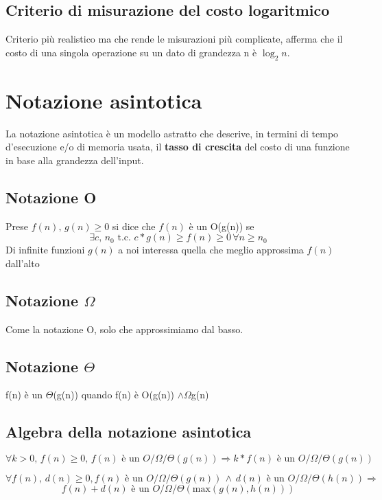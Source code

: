 \documentclass{report}
\newcommand{\T}[1]{$\Theta$(#1)}
\begin{document}
    \subsection{Criterio di misurazione del costo logaritmico}
        Criterio più realistico ma che rende le misurazioni più complicate, afferma 
        che il costo di una singola operazione su un dato di grandezza n è $\log_{2}n$. 
\section{Notazione asintotica}
    La notazione asintotica è un modello astratto che descrive, in termini di 
    tempo d'esecuzione e/o di memoria usata, il \textbf{tasso di crescita} del
    costo di una funzione in base alla grandezza dell'input.
    \subsection{Notazione O}
        Prese $f\left(n\right), \, g\left(n\right) \geq 0$ si dice che $f(n)$ è un O(g(n)) se 
        $$\exists c, \, n_0 \textrm{ t.c. } c*g\left(n\right) \geq f\left(n\right) \geq 0 \, \forall n \geq n_0$$
        Di infinite funzioni $g\left(n\right)$ a noi interessa quella che meglio approssima $f\left(n\right)$ 
        dall'alto
    \subsection{Notazione $\Omega$}
        Come la notazione O, solo che approssimiamo dal basso.
    \subsection{Notazione $\Theta$}
        f(n) è un \T{g(n)} quando f(n) è O(g(n)) $\wedge \Omega$g(n)
    \subsection{Algebra della notazione asintotica}
        $$\forall k > 0, \, f\left(n\right) \geq 0, \, f\left(n\right) \textrm{ è un }
            O/\Omega/\Theta\left(g\left(n\right)\right) \Longrightarrow k * f\left(n\right) \textrm{ è un }
            O/\Omega/\Theta\left(g\left(n\right)\right)$$

        $$\forall f\left(n\right), \, d\left(n\right) \geq 0, f\left(n\right) \textrm{ è un }
            O/\Omega/\Theta\left(g\left(n\right)\right) \, \wedge \, d\left(n\right) \textrm{ è un }
            O/\Omega/\Theta\left(h\left(n\right)\right) \Longrightarrow$$
        $$f\left(n\right) + d\left(n\right) \textrm{ è un } 
            O/\Omega/\Theta\left(\textrm{max}\left(g\left(n\right), h\left(n\right)\right)\right)$$
\end{document}
